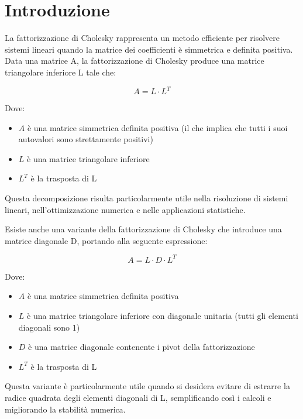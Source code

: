 \chapter*{Introduzione}

La fattorizzazione di Cholesky rappresenta un metodo efficiente per risolvere sistemi lineari quando la matrice dei coefficienti 
è simmetrica e definita positiva. Data una matrice A, la fattorizzazione di Cholesky produce una matrice triangolare inferiore L tale che:

$$A = L \cdot L^T$$

Dove:
\begin{itemize}
    \item $A$ è una matrice simmetrica definita positiva (il che implica che tutti i suoi autovalori sono strettamente positivi)
    \item $L$ è una matrice triangolare inferiore
    \item $L^T$ è la trasposta di L
\end{itemize}
Questa decomposizione risulta particolarmente utile nella risoluzione di sistemi lineari, nell'ottimizzazione 
numerica e nelle applicazioni statistiche.

Esiste anche una variante della fattorizzazione di Cholesky che introduce una matrice diagonale D, portando alla seguente
espressione:

$$A = L \cdot D \cdot L^T$$

Dove:
\begin{itemize}
    \item $A$ è una matrice simmetrica definita positiva
    \item $L$ è una matrice triangolare inferiore con diagonale unitaria (tutti gli elementi diagonali sono 1)
    \item $D$ è una matrice diagonale contenente i pivot della fattorizzazione
    \item $L^T$ è la trasposta di L
\end{itemize}
Questa variante è particolarmente utile quando si desidera evitare di estrarre la radice quadrata degli elementi diagonali
di L, semplificando così i calcoli e migliorando la stabilità numerica.

